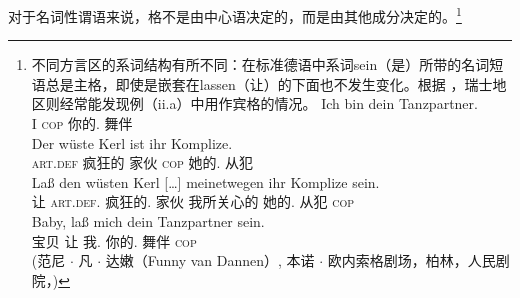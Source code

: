 对于名词性谓语\label{page-Kasuskongruenz}来说，格不是由中心语决定的，而是由其他成分决定的。\footnote{%
不同方言区的系词结构有所不同：在标准德语中系词sein（是）所带的名词短语总是主格，即使是嵌套在lassen（让）的下面也不发生变化。根据 \citet*[{\S}\,1259]{Duden95-Authors}，瑞士地区则经常能发现例（ii.a）中用作宾格的情况。
\eal
\ex 
\gll Ich bin dein Tanzpartner.\\
     I \textsc{cop} 你的.\nom{} 舞伴\\
\ex 
\gll Der wüste Kerl ist ihr Komplize.\\
     \textsc{art}.\textsc{def} 疯狂的  家伙  \textsc{cop}  她的.\nom{} 从犯\\
\ex 
\gll Laß den wüsten Kerl [\ldots] meinetwegen ihr Komplize sein.\\
     让 \textsc{art}.\textsc{def}.\acc{} 疯狂的.\acc{} 家伙 {} 我所关心的 她的.\nom{} 从犯 \textsc{cop}\\
 \citep*[{\S}\,6925]{Duden66-Authors}%
\ex 
\gll Baby, laß mich dein Tanzpartner sein.\\
     宝贝 让 我.\acc{} 你的.\nom{} 舞伴 \textsc{cop}\\
  (范尼 $\cdot$ 凡 $\cdot$ 达嫩（Funny van Dannen）, 本诺 $\cdot$ 欧内索格剧场，柏林，人民剧院，)
\zl

        \eal
        \zllast} 
